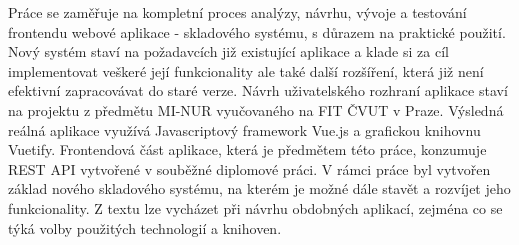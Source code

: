 Práce se zaměřuje na kompletní proces analýzy, návrhu, vývoje a testování frontendu webové aplikace - skladového systému, s důrazem na praktické použití. Nový systém staví na požadavcích již existující aplikace a klade si za cíl implementovat veškeré její funkcionality ale také další rozšíření, která již není efektivní zapracovávat do staré verze. Návrh uživatelského rozhraní aplikace staví na projektu z předmětu MI-NUR vyučovaného na FIT ČVUT v Praze. Výsledná reálná aplikace využívá Javascriptový framework Vue.js a grafickou knihovnu Vuetify. Frontendová část aplikace, která je předmětem této práce, konzumuje REST API vytvořené v souběžné diplomové práci. V rámci práce byl vytvořen základ nového skladového systému, na kterém je možné dále stavět a rozvíjet jeho funkcionality. Z textu lze vycházet při návrhu obdobných aplikací, zejména co se týká volby použitých technologií a knihoven.
